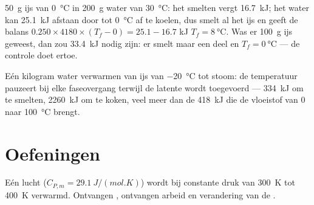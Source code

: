\begin{example}\label{ex:b1:first-law:ice}
\qty{50}{g} ijs van \qty{0}{\degreeCelsius} in \qty{200}{g} water van
\qty{30}{\degreeCelsius}: het smelten vergt \qty{16.7}{kJ}; het water kan
\qty{25.1}{kJ} afstaan door tot \qty{0}{\degreeCelsius} af te koelen, dus smelt al het ijs
en geeft de balans $0.250 \times 4180 \times (T_f - 0) = 25.1 - 16.7$ kJ
$T_f = \qty{8}{\degreeCelsius}$. Was er \qty{100}{g} ijs geweest, dan zou
\qty{33.4}{kJ} nodig zijn: er smelt maar een deel en $T_f = \qty{0}{\degreeCelsius}$
--- de controle doet ertoe.
\end{example}

\begin{omfigure}

{\small Eén kilogram water verwarmen van ijs van \qty{-20}{\degreeCelsius}
tot stoom: de temperatuur pauzeert bij elke faseovergang terwijl de
latente  wordt toegevoerd --- \qty{334}{kJ} om te smelten, \qty{2260}{kJ} om te koken,
veel meer dan de \qty{418}{kJ} die de vloeistof van \qty{0}{} naar
\qty{100}{\degreeCelsius} brengt.}
\end{omfigure}

\section{Oefeningen}

\begin{exercise}[$\star$]\label{exo:b1:first-law:1}
Eén  lucht ($C_{P,m} = \qty{29.1}{J/(mol.K)}$) wordt bij constante druk van
\qty{300}{K} tot \qty{400}{K} verwarmd. Ontvangen , ontvangen arbeid
en verandering van de .
\end{exercise}


